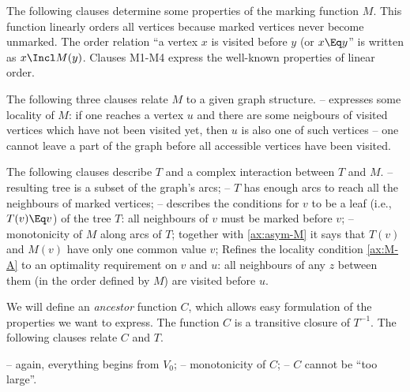 The following clauses determine some properties of the marking function $M$. This
function linearly orders all vertices because marked vertices never become
unmarked. The order relation ``a vertex $x$ is visited before $y$ 
(or \(x\Eq y\)'' is
written as \(x\Incl M(y)\). Clauses M1-M4 express the well-known properties
of linear order.

The following three clauses relate $M$ to a given graph structure.
   -- expresses some locality of $M$: if one reaches a vertex $u$ and
there are some neigbours of visited vertices which have not
been visited yet, then $u$ is also
one of such vertices -- one cannot leave a part of the graph before
all accessible vertices have been visited.

The following clauses describe $T$ and a complex interaction between $T$ and
$M$.   
  -- resulting tree is a subset of the graph's arcs;
  -- $T$ has enough arcs to reach all the neighbours of marked vertices;
  -- describes the conditions for $v$ to be a leaf (i.e., \(T(v)\Eq v\)) of the
  tree $T$: all neighbours of $v$ must be marked before $v$;
  -- monotonicity of $M$ along arcs of $T$; together with
  \ref{ax:asym-M} it says that $T(v)$ and $M(v)$ have only one common value
  $v$;
 Refines the locality condition \ref{ax:M-A} to an optimality
requirement on $v$ and $u$:
all neighbours of any $z$ between them (in the
order defined by $M$) are visited before $u$.  

We will define an {\em ancestor} function $C$, which allows easy
formulation of the properties we want to express. The function $C$ is a
transitive closure of \(T^{-1}\). The following clauses relate $C$ and $T$.

   -- again, everything begins from $V_0$;
   -- monotonicity of $C$;
   -- $C$ cannot be ``too large''.

